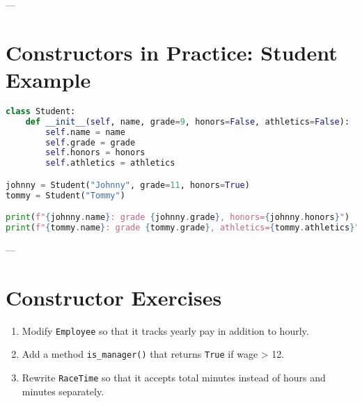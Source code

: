 ---

\section{Constructors in Practice: Student Example}

\begin{lstlisting}[language=Python, caption={Constructor with several defaults.}]
class Student:
    def __init__(self, name, grade=9, honors=False, athletics=False):
        self.name = name
        self.grade = grade
        self.honors = honors
        self.athletics = athletics

johnny = Student("Johnny", grade=11, honors=True)
tommy = Student("Tommy")

print(f"{johnny.name}: grade {johnny.grade}, honors={johnny.honors}")
print(f"{tommy.name}: grade {tommy.grade}, athletics={tommy.athletics}")
\end{lstlisting}

---

\section{Constructor Exercises}

\begin{enumerate}
    \item Modify \texttt{Employee} so that it tracks yearly pay in addition to hourly.
    \item Add a method \texttt{is\_manager()} that returns \texttt{True} if wage > 12.
    \item Rewrite \texttt{RaceTime} so that it accepts total minutes instead of hours and minutes separately.
\end{enumerate}

